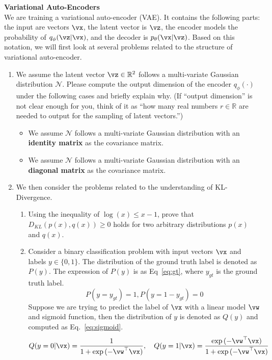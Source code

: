 \begin{Q}
\textbf{\Large Variational Auto-Encoders}\\

We are training a variational auto-encoder (VAE). It contains the following parts: the input are vectors $\vx$, the latent vector is $\vz$, the encoder models the probability of $q_{\phi}(\vz|\vx)$, and the decoder is $p_{\theta}(\vx|\vz)$. Based on this notation, we will first look at several problems related to the structure of variational auto-encoder.

\begin{enumerate}

\item We assume the latent vector $\vz \in \mathbb{R}^{2}$ follows a multi-variate Gaussian distribution $\mathcal{N}$. Please compute the output dimension of the encoder $q_{\phi}(\cdot)$ under the following cases and briefly explain why. (If ``output dimension'' is not clear enough for you, think of it as ``how many real numbers $r\in \mathbb{R}$ are needed to output for the sampling of latent vectors.'')

\begin{itemize}
    \item We assume $\mathcal{N}$ follows a multi-variate Gaussian distribution with an \textbf{identity matrix} as the covariance matrix.
    \item We assume $\mathcal{N}$ follows a multi-variate Gaussian distribution with an \textbf{diagonal matrix} as the covariance matrix.
\end{itemize}

\item
We then consider the problems related to the understanding of KL-Divergence.

\begin{enumerate}
    \item Using the inequality of $\log(x) \leq x - 1$, prove that $D_{KL}(p(x), q(x))\ge 0$ holds for two arbitrary distributions $p(x)$ and $q(x)$.
    
    \item Consider a binary classification problem with input vectors $\vx$ and labels $y\in\{0, 1\}$. The distribution of the ground truth label is denoted as $P(y)$. The expression of $P(y)$ is as Eq~\ref{eq:gt}, where $y_{gt}$ is the ground truth label.
    \begin{equation}
        P(y=y_{gt})=1, P(y=1-y_{gt})=0
        \label{eq:gt}
    \end{equation}
    Suppose we are trying to predict the label of $\vx$ with a linear model $\vw$ and sigmoid function, then the distribution of $y$ is denoted as $Q(y)$ and computed as Eq.~\ref{eq:sigmoid}.
    \begin{equation}
        Q(y=0|\vx)=\frac{1}{1+\exp{(-\vw^\top \vx)}},\quad Q(y=1|\vx)=\frac{\exp{(-\vw^\top \vx)}}{1+\exp{(-\vw^\top \vx)}}
        \label{eq:sigmoid}
    \end{equation}
    

\end{enumerate}
\end{enumerate}
\end{Q}
